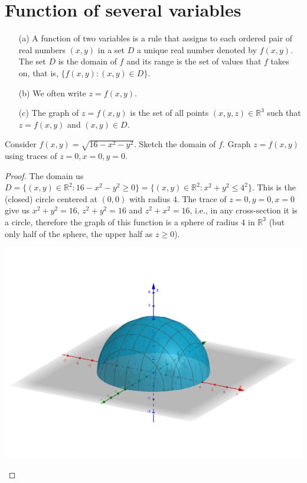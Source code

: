 \section{Function of several variables}
\begin{definition}\quad 
\begin{itemize}
    \item[(a)] A function of two variables is a rule that assigns to each ordered pair of real numbers $(x,y)$ in a set $D$ a unique real number denoted by $f(x,y)$. The set $D$ is the domain of $f$ and its range is the set of values that $f$ takes on, that is, $\{f(x,y):(x,y)\in D\}$.
    \item[(b)] We often write $z=f(x,y)$.
    \item[(c)] The graph of $z=f(x,y)$ is the set of all points $(x,y,z)\in \mathbb{R}^3$ such that $z = f(x,y)$ and $(x,y)\in D$.
\end{itemize}
\end{definition}

\begin{example} Consider $f(x,y) = \sqrt{16-x^2-y^2}$. Sketch the domain of $f$. Graph $z=f(x,y)$ using traces of $z=0, x=0, y=0$.
\end{example}
\begin{proof} The domain us $D = \{(x,y)\in \mathbb{R}^2: 16-x^2-y^2\geq 0\} =  \{(x,y)\in \mathbb{R}^2: x^2+y^2 \leq 4^2\}$. This is the (closed) circle centered at $(0,0)$ with radius $4$. The trace of $z=0, y=0, x=0$ give us $x^2+y^2 = 16$, $z^2+y^2=16$ and $z^2+x^2=16$, i.e., in any cross-section it is a circle, therefore the graph of this function is a sphere of radius $4$ in $\mathbb{R}^3$ (but only half of the sphere, the upper half as $z\geq 0$). 
\begin{center}
\includegraphics[scale=0.1]{images/11-ex1.png}    
\end{center}    
\end{proof}

